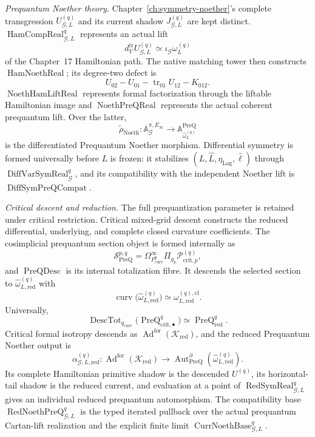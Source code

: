 \begin{theorem}
\medskip
\noindent\emph{Prequantum Noether theory.}
Chapter~\ref{ch:symmetry-noether}'s complete transgression
$U_{\mathcal G,L}^{(q)}$ and its current shadow $J_{\mathcal G,L}^{(q)}$ are kept
distinct.  $\operatorname{HamCompReal}_{\mathcal G,L}^{q}$ represents an actual
lift
\[
\boxed{
d_V^{\mathrm{tr}}U_{\mathcal G,L}^{(q)}
\simeq
\iota_{\mathcal G}\omega_L^{(q)}
}
\]
of the Chapter~17 Hamiltonian path.  The native matching tower then constructs
$\operatorname{HamNoethReal}$; its degree-two defect is
\[
U_{02}-U_{01}-\operatorname{tr}_{01}U_{12}-K_{012}.
\]
$\operatorname{NoethHamLiftReal}$ represents formal factorization through the
liftable Hamiltonian image and $\operatorname{NoethPreQReal}$ represents the
actual coherent prequantum lift.  Over the latter,
\[
\widetilde\rho_{\mathrm{Noeth}}:
\mathbb A_{\mathcal G}^{\pi,E_\infty}
\longrightarrow
\mathbb A_{\widehat\omega_L^{(q)}}^{\mathrm{PreQ}}
\]
is the differentiated Prequantum Noether morphism.  Differential symmetry is formed universally before $L$ is frozen: it stabilizes
$(L,\widehat L,\eta_{\mathrm{Lag}},\widehat\ell)$ through
$\operatorname{DiffVarSymReal}^{q}_{\mathcal G}$, and its compatibility with the
independent Noether lift is $\operatorname{DiffSymPreQCompat}$.

\medskip
\noindent\emph{Critical descent and reduction.}
The full prequantization parameter is retained under critical restriction.
Critical mixed-grid descent constructs the reduced differential, underlying, and
complete closed curvature coefficients.  The cosimplicial prequantum section
object is formed internally as
\[
\mathscr S_{\mathrm{PreQ}}^{p,q}
=
\Omega_{P_{\mathrm{curv}}^q}^\infty
\Pi_{g_p}\mathscr P_{\mathrm{crit},p}^{(q)},
\]
and $\operatorname{PreQDesc}$ is its internal totalization fibre.  It descends
the selected section to
$\widehat\omega_{L,\mathrm{red}}^{(q)}$ with
\[
\boxed{
\operatorname{curv}
\bigl(\widehat\omega_{L,\mathrm{red}}^{(q)}\bigr)
\simeq
\omega_{L,\mathrm{red}}^{(q),\mathrm{cl}}.
}
\]
Universally,
\[
\boxed{
\operatorname{DescTot}_{q_{\mathrm{curv}}}
\bigl(\operatorname{PreQ}_{\mathrm{crit},\bullet}^{q}\bigr)
\simeq
\operatorname{PreQ}_{\mathrm{red}}^q.
}
\]
Critical formal isotropy descends as
$\operatorname{Ad}^{\mathrm{for}}(\mathcal K_{\mathrm{red}})$, and the reduced
Prequantum Noether output is
\[
\boxed{
\alpha_{\mathcal G,L,\mathrm{red}}^{(q)}:
\operatorname{Ad}^{\mathrm{for}}(\mathcal K_{\mathrm{red}})
\longrightarrow
\operatorname{Aut}^{\partial}_{\mathrm{PreQ}}
(\widehat\omega_{L,\mathrm{red}}^{(q)}).
}
\]
Its complete Hamiltonian primitive shadow is the descended $U^{(q)}$, its
horizontal-tail shadow is the reduced current, and evaluation at a point of
$\operatorname{RedSymReal}_{\mathcal G,L}^{q}$ gives an individual reduced
prequantum automorphism.
The compatibility base $\operatorname{RedNoethPreQ}_{\mathcal G,L}^q$ is the
typed iterated pullback over the actual prequantum Cartan-lift realization and
the explicit finite limit $\operatorname{CurrNoethBase}_{\mathcal G,L}^q$.


\end{theorem}
